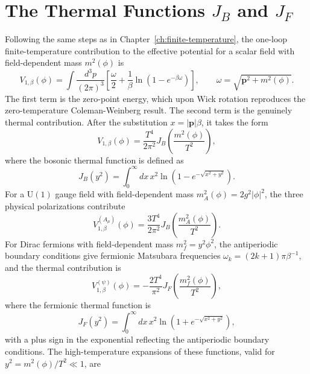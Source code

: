 \section{The Thermal Functions \texorpdfstring{$J_B$}{JB} and
  \texorpdfstring{$J_F$}{JF}}

Following the same steps as in Chapter~\ref{ch:finite-temperature},
the one-loop finite-temperature contribution to the effective potential
for a scalar field with field-dependent mass $m^2(\phi)$ is
\begin{equation}
	V_{1,\beta}(\phi) = \int\frac{d^3p}{(2\pi)^3}
	\left[\frac{\omega}{2}
		+ \frac{1}{\beta}\ln(1-e^{-\beta\omega})\right],
	\qquad \omega = \sqrt{\mathbf{p}^2+m^2(\phi)}.
\end{equation}
The first term is the zero-point energy, which upon Wick rotation
reproduces the zero-temperature Coleman-Weinberg result. The second
term is the genuinely thermal contribution. After the substitution
$x = |\mathbf{p}|\beta$, it takes the form
\begin{equation}
	V_{1,\beta}(\phi) = \frac{T^4}{2\pi^2}
	J_B\!\left(\frac{m^2(\phi)}{T^2}\right),
\end{equation}
where the bosonic thermal function is defined as
\begin{equation}
	J_B(y^2) = \int_0^{\infty}dx\,x^2
	\ln\!\left(1 - e^{-\sqrt{x^2+y^2}}\right).
\end{equation}
For a $\mathrm{U}(1)$ gauge field with field-dependent mass
$m_A^2(\phi) = 2g^2|\phi|^2$, the three physical polarizations
contribute
\begin{equation}
	V_{1,\beta}^{(A_\mu)}(\phi)
	= \frac{3T^4}{2\pi^2}
	J_B\!\left(\frac{m_A^2(\phi)}{T^2}\right).
\end{equation}
For Dirac fermions with field-dependent mass $m_f^2 = y^2\phi^2$,
the antiperiodic boundary conditions give fermionic Matsubara frequencies
$\omega_k = (2k+1)\pi\beta^{-1}$, and the thermal contribution is
\begin{equation}
	V_{1,\beta}^{(\psi)}(\phi)
	= -\frac{2T^4}{\pi^2}
	J_F\!\left(\frac{m_f^2(\phi)}{T^2}\right),
\end{equation}
where the fermionic thermal function is
\begin{equation}
	J_F(y^2) = \int_0^{\infty}dx\,x^2
	\ln\!\left(1 + e^{-\sqrt{x^2+y^2}}\right),
\end{equation}
with a plus sign in the exponential reflecting the antiperiodic boundary
conditions. The high-temperature expansions of these functions, valid
for $y^2 = m^2(\phi)/T^2\ll 1$, are
